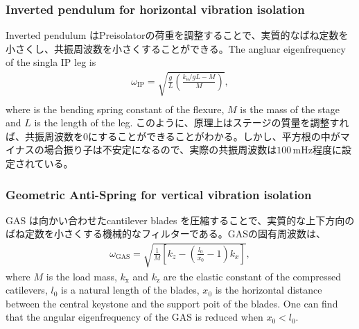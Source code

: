 \subsubsection{Inverted pendulum for horizontal vibration isolation}
Inverted pendulum はPreisolatorの荷重を調整することで、実質的なばね定数を小さくし、共振周波数を小さくすることができる。The angluar eigenfrequency of the singla IP leg is 
\begin{eqnarray}
  \omega_{\mathrm{IP}}=\sqrt{\frac{g}{L}\left(\frac{k_{\mathrm{\theta}}/gL-M}{M}\right)},\\
\end{eqnarray}
where is the bending spring constant of the flexure, $M$ is the mass of the stage and $L$ is the length of the leg. このように、原理上はステージの質量を調整すれば、共振周波数を0にすることができることがわかる。しかし、平方根の中がマイナスの場合振り子は不安定になるので、実際の共振周波数は$100\,\mathrm{mHz}$程度に設定されている。

\subsubsection{Geometric Anti-Spring for vertical vibration isolation}
GAS は向かい合わせたcantilever blades を圧縮することで、実質的な上下方向のばね定数を小さくする機械的なフィルターである。GASの固有周波数は、
\begin{eqnarray}
  \omega_{\mathrm{GAS}} = \sqrt{\frac{1}{M}\left[{ k_{z}- \left(\frac{l_{0}}{x_{0}}-1\right) k_{x}}\right]},
\end{eqnarray}
where $M$ is the load mass, $k_{\mathrm{x}}$ and $k_{\mathrm{z}}$ are the elastic constant of the compressed catilevers, $l_{0}$ is a natural length of the blades, $x_0$ is the horizontal distance between the central keystone and the support poit of the blades. One can find that the angular eigenfrequency of the GAS is reduced when $x_{0}<l_{0}$.

